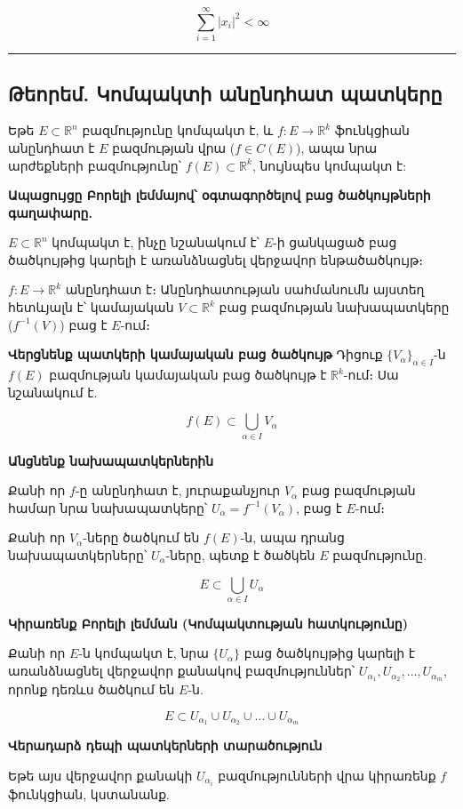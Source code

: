 \documentclass[12pt, a4paper]{article}
\begin{document}
$$\sum_{i=1}^{\infty} |x_i|^2 < \infty$$

\vspace{1em}
\hrule
\vspace{1em}

\subsection{Թեորեմ. Կոմպակտի անընդհատ պատկերը}

Եթե $E \subset \mathbb{R}^n$ բազմությունը կոմպակտ է, և $f: E \to \mathbb{R}^k$ ֆունկցիան անընդհատ է $E$ բազմության վրա ($f \in C(E)$), ապա նրա արժեքների բազմությունը՝ $f(E) \subset \mathbb{R}^k$, նույնպես կոմպակտ է:

\textbf{Ապացույցը Բորելի լեմմայով՝ օգտագործելով բաց ծածկույթների գաղափարը.}

$E \subset \mathbb{R}^n$ կոմպակտ է, ինչը նշանակում է՝ $E$-ի ցանկացած բաց ծածկույթից կարելի է առանձնացնել վերջավոր ենթածածկույթ։

$f: E \to \mathbb{R}^k$ անընդհատ է։ Անընդհատության սահմանումն այստեղ հետևյալն է՝ կամայական $V \subset \mathbb{R}^k$ բաց բազմության նախապատկերը ($f^{-1}(V)$) բաց է $E$-ում։

\textbf{Վերցնենք պատկերի կամայական բաց ծածկույթ}
Դիցուք $\{V_\alpha\}_{\alpha \in I}$-ն $f(E)$ բազմության կամայական բաց ծածկույթ է $\mathbb{R}^k$-ում։ Սա նշանակում է.

$$f(E) \subset \bigcup_{\alpha \in I} V_\alpha$$

\textbf{Անցնենք նախապատկերներին}

Քանի որ $f$-ը անընդհատ է, յուրաքանչյուր $V_\alpha$ բաց բազմության համար նրա նախապատկերը՝ $U_\alpha = f^{-1}(V_\alpha)$, բաց է $E$-ում։

Քանի որ $V_\alpha$-ները ծածկում են $f(E)$-ն, ապա դրանց նախապատկերները՝ $U_\alpha$-ները, պետք է ծածկեն $E$ բազմությունը.

$$E \subset \bigcup_{\alpha \in I} U_\alpha$$

\textbf{Կիրառենք Բորելի լեմման (Կոմպակտության հատկությունը)}

Քանի որ $E$-ն կոմպակտ է, նրա $\{U_\alpha\}$ բաց ծածկույթից կարելի է առանձնացնել վերջավոր քանակով բազմություններ՝ $U_{\alpha_1}, U_{\alpha_2}, \dots, U_{\alpha_m}$, որոնք դեռևս ծածկում են $E$-ն.

$$E \subset U_{\alpha_1} \cup U_{\alpha_2} \cup \dots \cup U_{\alpha_m}$$

\textbf{Վերադարձ դեպի պատկերների տարածություն}

Եթե այս վերջավոր քանակի $U_{\alpha_i}$ բազմությունների վրա կիրառենք $f$ ֆունկցիան, կստանանք.
\end{document}
